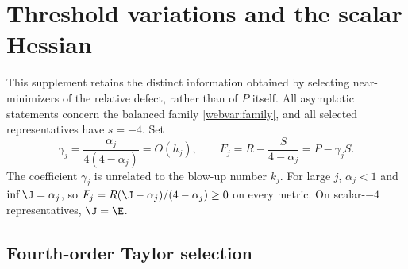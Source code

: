 \section{Threshold variations and the scalar Hessian}
\label{sec:web-threshold-variation}

This supplement retains the distinct information obtained by selecting
near-minimizers of the relative defect, rather than of $P$ itself.
All asymptotic statements concern the balanced family
\eqref{webvar:family}, and all selected representatives have $s=-4$.
Set
\begin{equation}\label{webvar:threshold-functional}
 \gamma_j=\frac{\alpha_j}{4(4-\alpha_j)}=O(h_j),\qquad
 F_j=R-\frac{S}{4-\alpha_j}=P-\gamma_jS.
\end{equation}
The coefficient $\gamma_j$ is unrelated to the blow-up number $k_j$.
For large $j$, $\alpha_j<1$ and $\inf\J=\alpha_j$, so
$F_j=R(\J-\alpha_j)/(4-\alpha_j)\ge0$ on every metric.
On scalar-$-4$ representatives, $\J=\E$.

\subsection{Fourth-order Taylor selection}

